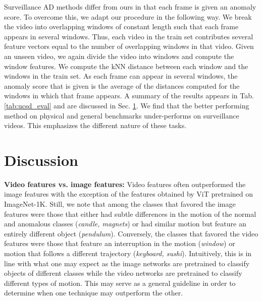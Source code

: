 \documentclass{article}
\begin{document}
Surveillance AD methods differ from ours in that each frame is given an anomaly score. To overcome this, we adapt our procedure in the following way. We break the video into overlapping windows of constant length such that each frame appears in several windows. Thus, each video in the train set contributes several feature vectors equal to the number of overlapping windows in that video. Given an unseen video, we again divide the video into windows and compute the window features. We compute the kNN distance between each window and the windows in the train set. As each frame can appear in several windows, the anomaly score that is given is the average of the distances computed for the windows in which that frame appears. A summary of the results appears in Tab.\ref{tab:ucsd_eval} and are discussed in Sec. \ref{sec:discussion}. We find that the better performing method on physical and general benchmarks under-performs on surveillance videos. This emphasizes the different nature of these tasks.













\section{Discussion}
\label{sec:discussion}

\textbf{Video features vs. image features:} Video features often outperformed the image features with the exception of the features obtained by ViT pretrained on ImageNet-1K. Still, we note that among the classes that favored the image features were those that either had subtle differences in the motion of the normal and anomalous classes (\textit{candle, magnets}) or had similar motion but feature an entirely different object (\textit{pendulum}).  Conversely, the classes that favored the video features were those that feature an interruption in the motion (\textit{window}) or motion that follows a different trajectory (\textit{keyboard, sushi}). Intuitively, this is in line with what one may expect as the image networks are pretrained to classify objects of different classes while the video networks are pretrained to classify different types of motion. This may serve as a general guideline in order to determine when one technique may outperform the other. 
\end{document}
